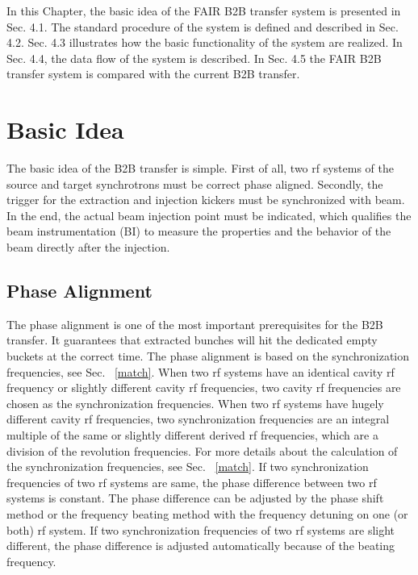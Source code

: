 

In this Chapter, the basic idea of the FAIR B2B transfer system is presented in Sec. 4.1. The standard procedure of the system is defined and described in Sec. 4.2. Sec. 4.3 illustrates how the basic functionality of the system are realized. In Sec. 4.4, the data flow of the system is described. In Sec. 4.5 the FAIR B2B transfer system is compared with the current B2B transfer. 

\section{Basic Idea} 
The basic idea of the B2B transfer is simple. First of all, two rf systems of the source and target synchrotrons must be correct phase aligned. Secondly, the trigger for the extraction and injection kickers must be synchronized with beam. In the end, the actual beam injection point must be indicated, which qualifies the beam instrumentation (\gls{BI}) to measure the properties and the behavior of the beam directly after the injection. 



\subsection{Phase Alignment}
The phase alignment is one of the most important prerequisites for the B2B transfer. It guarantees that extracted bunches will hit the dedicated empty buckets at the correct time. The phase alignment is based on the synchronization frequencies, see Sec. ~\ref{match}. When two rf systems have an identical cavity rf frequency or slightly different cavity rf frequencies, two cavity rf frequencies are chosen as the synchronization frequencies. When two rf systems have hugely different cavity rf frequencies, two synchronization frequencies are an integral multiple of the same or slightly different derived rf frequencies, which are a division of the revolution frequencies. For more details about the calculation of the synchronization frequencies, see Sec. ~\ref{match}. If two synchronization frequencies of two rf systems are same, the phase difference between two rf systems is constant. The phase difference can be adjusted by the phase shift method or the frequency beating method with the frequency detuning on one (or both) rf system. If two synchronization frequencies of two rf systems are slight different, the phase difference is adjusted automatically because of the beating frequency. %

